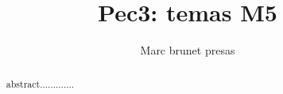\documentclass[preprint,11pt]{elsarticle}
\begin{document}
\begin{frontmatter}

    \title{Pec3: temas M5}
    \author{Marc brunet presas}
    \address{Manresa, Barcelona,}
    \begin{abstract}
    abstract.............

    \end{abstract}
\end{frontmatter}
\end{document}
